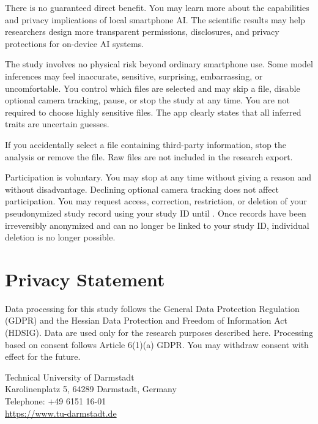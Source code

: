\documentclass[10pt,a4paper]{article}
\begin{document}
There is no guaranteed direct benefit. You may learn more about the capabilities and privacy implications of local smartphone AI. The scientific results may help researchers design more transparent permissions, disclosures, and privacy protections for on-device AI systems.

The study involves no physical risk beyond ordinary smartphone use. Some model inferences may feel inaccurate, sensitive, surprising, embarrassing, or uncomfortable. You control which files are selected and may skip a file, disable optional camera tracking, pause, or stop the study at any time. You are not required to choose highly sensitive files. The app clearly states that all inferred traits are uncertain guesses.

If you accidentally select a file containing third-party information, stop the analysis or remove the file. Raw files are not included in the research export.

Participation is voluntary. You may stop at any time without giving a reason and without disadvantage. Declining optional camera tracking does not affect participation. You may request access, correction, restriction, or deletion of your pseudonymized study record using your study ID until . Once records have been irreversibly anonymized and can no longer be linked to your study ID, individual deletion is no longer possible.

\newpage
\section*{Privacy Statement}

Data processing for this study follows the General Data Protection Regulation (GDPR) and the Hessian Data Protection and Freedom of Information Act (HDSIG). Data are used only for the research purposes described here. Processing based on consent follows Article 6(1)(a) GDPR. You may withdraw consent with effect for the future.

Technical University of Darmstadt\\
Karolinenplatz 5, 64289 Darmstadt, Germany\\
Telephone: +49 6151 16-01\\
\url{https://www.tu-darmstadt.de}
\end{document}
